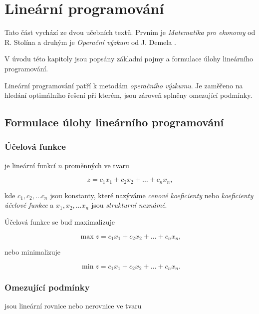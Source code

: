 \section{Lineární programování}
Tato část vychází ze dvou učebních textů. Prvním je \textit{Matematika pro ekonomy} od R. Stolína \cite{matematika_pro_ekonomy} a druhým je \textit{Operační výzkum} od J. Demela \cite{demel}.


V úvodu této kapitoly jsou popsány základní pojmy a formulace úlohy lineárního programování.

Lineární programování patří k metodám \textit{operačního výzkumu}.
Je zaměřeno na hledání optimálního řešení při kterém, jsou zároveň splněny omezující podmínky.

\subsection{Formulace úlohy lineárního programování}

\subsubsection{Účelová funkce}

je lineární funkcí $n$ proměnných ve tvaru

\begin{equation}
    z = c_1x_1 + c_2x_2 + \ldots + c_nx_n ,
\end{equation}


kde $c_1, c_2, \ldots c_n$ jsou konstanty, které nazýváme \textit{cenové koeficienty} nebo \textit{koeficienty účelové funkce} a 
$x_1, x_2, \ldots x_n$ jsou \textit{strukturní neznámé}.

Účelová funkce se buď maximalizuje

\begin{equation}
    \max z = c_1x_1 + c_2x_2 + \ldots + c_nx_n ,
\end{equation}

nebo minimalizuje

\begin{equation}
    \min z = c_1x_1 + c_2x_2 + \ldots + c_nx_n .
\end{equation}

\subsubsection{Omezující podmínky}

jsou lineární rovnice nebo nerovnice ve tvaru

